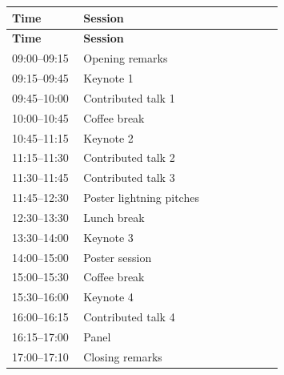 \documentclass[11pt]{article}
\begin{document}
\begin{longtable}{@{}p{0.25\linewidth}p{0.70\linewidth}@{}}

\toprule

\textbf{Time} & \textbf{Session} \\

\midrule

\endfirsthead

\toprule

\textbf{Time} & \textbf{Session} \\

\midrule

\endhead

09:00--09:15 & Opening remarks \\

09:15--09:45 & Keynote 1 \\

09:45--10:00 & Contributed talk 1 \\

10:00--10:45 & Coffee break \\

10:45--11:15 & Keynote 2 \\

11:15--11:30 & Contributed talk 2 \\

11:30--11:45 & Contributed talk 3 \\

11:45--12:30 & Poster lightning pitches \\

12:30--13:30 & Lunch break \\

13:30--14:00 & Keynote 3 \\

14:00--15:00 & Poster session \\

15:00--15:30 & Coffee break \\

15:30--16:00 & Keynote 4 \\

16:00--16:15 & Contributed talk 4 \\

16:15--17:00 & Panel \\

17:00--17:10 & Closing remarks \\

\bottomrule

\end{longtable}
\end{document}
